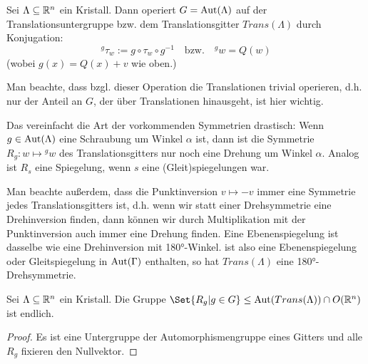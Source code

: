 \begin{lemma}
Sei $\Lambda\subseteq\mathbb{R}^n$ ein Kristall. Dann operiert $G=\operatorname{Aut}(\Lambda)$ auf der Translationsuntergruppe bzw. dem Translationsgitter $Trans(\Lambda)$ durch Konjugation:
\[{^g \tau_w} := g\circ\tau_w\circ g^{-1} \quad\text{bzw.}\quad {^g w} = Q(w)\]
(wobei $g(x)=Q(x)+v$ wie oben.)
\end{lemma}

\begin{remark}
Man beachte, dass bzgl. dieser Operation die Translationen trivial operieren, d.h. nur der Anteil an $G$, der über Translationen hinausgeht, ist hier wichtig.

Das vereinfacht die Art der vorkommenden Symmetrien drastisch: Wenn $g\in\operatorname{Aut}(\Lambda)$ eine Schraubung um Winkel $\alpha$ ist, dann ist die Symmetrie $R_g:w\mapsto{^g w}$ des Translationsgitters nur noch eine Drehung um Winkel $\alpha$. Analog ist $R_s$ eine Spiegelung, wenn $s$ eine (Gleit)spiegelungen war.

Man beachte außerdem, dass die Punktinversion $v\mapsto -v$ immer eine Symmetrie jedes Translationsgitters ist, d.h. wenn wir statt einer Drehsymmetrie eine Drehinversion finden, dann können wir durch Multiplikation mit der Punktinversion auch immer eine Drehung finden. Eine Ebenenspiegelung ist dasselbe wie eine Drehinversion mit 180°-Winkel. ist also eine Ebenenspiegelung oder Gleitspiegelung in $\operatorname{Aut}(\Gamma)$ enthalten, so hat $Trans(\Lambda)$ eine 180°-Drehsymmetrie.
\end{remark}

\begin{corollary}
Sei $\Lambda\subseteq\mathbb{R}^n$ ein Kristall. Die Gruppe $\Set{R_g | g\in G} \leq \Aut(Trans(\Lambda)) \cap O(\IR^n)$ ist endlich.
\end{corollary}
\begin{proof}
Es ist eine Untergruppe der Automorphismengruppe eines Gitters und alle $R_g$ fixieren den Nullvektor.
\end{proof}

